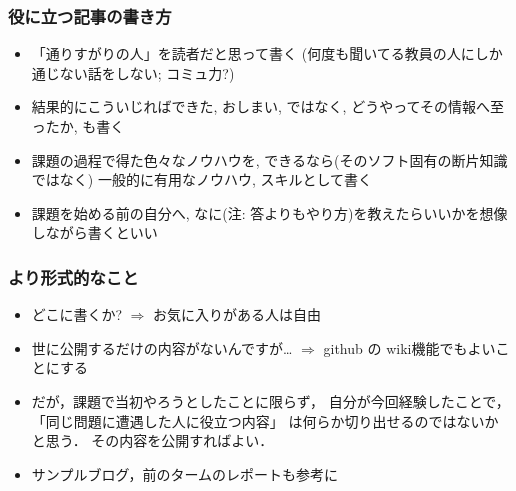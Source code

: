\documentclass[12pt,dvipdfmx]{beamer}
\newcommand{\ao}[1]{{\color{blue}#1}}
\begin{document}
\begin{frame}
\frametitle{役に立つ記事の書き方}
\begin{itemize}
\item 「通りすがりの人」を読者だと思って書く
  (何度も聞いてる教員の人にしか通じない話をしない; 
  コミュ力?)

\item 結果的にこういじればできた, おしまい, 
ではなく, \ao{どうやってその情報へ至ったか}, も書く

\item 課題の過程で得た色々なノウハウを, 
できるなら(そのソフト固有の断片知識ではなく)
一般的に有用なノウハウ, スキルとして書く

\item 課題を始める前の自分へ, なに(注: 答よりもやり方)を教えたらいいかを想像しながら書くといい
\end{itemize}
\end{frame}

\begin{frame}
\frametitle{より形式的なこと}
\begin{itemize}
\item<1-> どこに書くか? $\Rightarrow$ お気に入りがある人は自由
\item<2-> 世に公開するだけの内容がないんですが\ldots 
$\Rightarrow$ github の wiki機能でもよいことにする
\item<3-> だが，課題で当初やろうとしたことに限らず，
  自分が今回経験したことで，
  「同じ問題に遭遇した人に役立つ内容」
  は何らか切り出せるのではないかと思う．
  その内容を公開すればよい．

\item<4-> サンプルブログ，前のタームのレポートも参考に
\end{itemize}
\end{frame}
\end{document}
